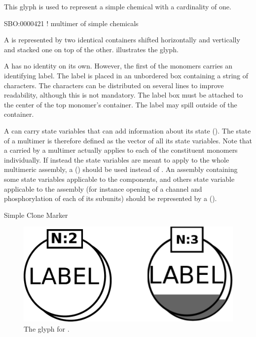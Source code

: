 This glyph is used to represent a simple chemical with a cardinality
of one.

\begin{glyphDescription}

\glyphSboTerm SBO:0000421 ! multimer of simple chemicals

\glyphContainer A  is represented by two identical containers shifted horizontally and vertically and stacked one on top of the other.   illustrates the glyph.

\glyphLabel A  has no identity on its own.  However, the first of the monomers carries an identifying label.  The label is placed in an unbordered box containing a string of characters.  The characters can be distributed on several lines to improve readability, although this is not mandatory.  The label box must be attached to the center of the top monomer's container.  The label may spill outside of the container.

\glyphAux A  can carry state variables that can add information about its state ().  The state of a multimer is therefore defined as the vector of all its state variables.  Note that a  carried by a multimer actually applies to each of the constituent monomers individually.  If instead the state variables are meant to apply to the whole multimeric assembly, a  () should be used instead of .  An assembly containing some state variables applicable to the components, and others state variable applicable to the assembly (for instance opening of a channel and phosphorylation of each of its subunits) should be represented by a  ().

\glyphCloning Simple Clone Marker

\end{glyphDescription}

\begin{figure}[H]
  \centering
  \includegraphics[scale = 0.3]{images/simpleChemicalMultimer}
  \caption{The \PD glyph for .}
  \label{fig:multimer}
\end{figure}

